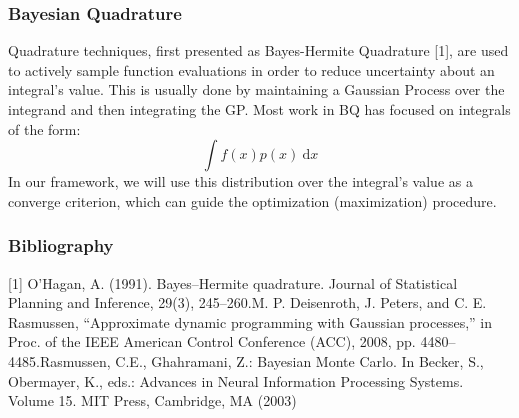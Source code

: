 \documentclass[9pt]{beamer}
\begin{document}
\begin{frame}
\frametitle{Bayesian Quadrature}
Quadrature techniques, first presented as Bayes-Hermite Quadrature [1], are used to actively sample function evaluations in order to reduce uncertainty about an integral's value. This is usually done by maintaining a Gaussian Process over the integrand and then integrating the GP. 
\newline\newline
Most work in BQ has focused on integrals of the form:
\begin{equation*}
   \int f(x) p(x)  \ \text{d}x
\end{equation*}
In our framework, we will use this distribution over the integral's value as a converge criterion, which can guide the optimization (maximization) procedure.
\end{frame}

\begin{frame}
\frametitle{Bibliography}
[1] O’Hagan, A. (1991). Bayes–Hermite quadrature. Journal of Statistical Planning and Inference, 29(3), 245–260.\newline
[2]   M.  P.  Deisenroth,  J.  Peters,  and  C.  E.  Rasmussen,  “Approximate dynamic programming with Gaussian processes,” in Proc. of the IEEE American Control Conference (ACC), 2008, pp. 4480–4485.\newline
[3] Rasmussen, C.E., Ghahramani, Z.: Bayesian Monte Carlo. In Becker, S., Obermayer, K., eds.: Advances in Neural Information Processing Systems. Volume 15. MIT Press, Cambridge, MA (2003)
\end{frame}

 
\end{document}
